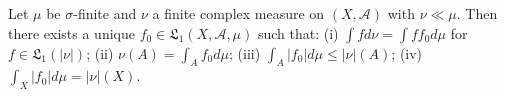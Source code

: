 Let $\mu$ be $\sigma$-finite and $\nu$ a finite complex measure on $(X, \mathcal{A})$ with $\nu \ll \mu$. Then there exists a unique $f_0 \in \mathfrak{L}_1(X, \mathcal{A}, \mu)$ such that: (i) $\int f d\nu = \int f f_0 d\mu$ for $f \in \mathfrak{L}_1(|\nu|)$; (ii) $\nu(A) = \int_A f_0 d\mu$; (iii) $\int_A |f_0| d\mu \leq |\nu|(A)$; (iv) $\int_X |f_0| d\mu = |\nu|(X)$.
